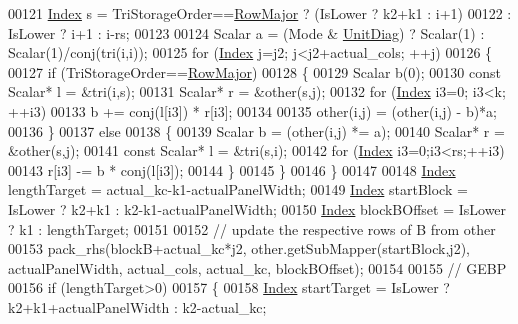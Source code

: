 \begin{DoxyCode}
00121             \hyperlink{namespace_eigen_a62e77e0933482dafde8fe197d9a2cfde}{Index} s  = TriStorageOrder==\hyperlink{group__enums_ggaacded1a18ae58b0f554751f6cdf9eb13acfcde9cd8677c5f7caf6bd603666aae3}{RowMajor} ? (IsLower ? k2+k1 : i+1)
00122                                                  :  IsLower ? i+1 : i-rs;
00123 
00124             Scalar a = (Mode & \hyperlink{group__enums_gga39e3366ff5554d731e7dc8bb642f83cdaddb72f888ac85d5a1c52333e54f9374b}{UnitDiag}) ? Scalar(1) : Scalar(1)/conj(tri(i,i));
00125             \textcolor{keywordflow}{for} (\hyperlink{namespace_eigen_a62e77e0933482dafde8fe197d9a2cfde}{Index} j=j2; j<j2+actual\_cols; ++j)
00126             \{
00127               \textcolor{keywordflow}{if} (TriStorageOrder==\hyperlink{group__enums_ggaacded1a18ae58b0f554751f6cdf9eb13acfcde9cd8677c5f7caf6bd603666aae3}{RowMajor})
00128               \{
00129                 Scalar b(0);
00130                 \textcolor{keyword}{const} Scalar* l = &tri(i,s);
00131                 Scalar* r = &other(s,j);
00132                 \textcolor{keywordflow}{for} (\hyperlink{namespace_eigen_a62e77e0933482dafde8fe197d9a2cfde}{Index} i3=0; i3<k; ++i3)
00133                   b += conj(l[i3]) * r[i3];
00134 
00135                 other(i,j) = (other(i,j) - b)*a;
00136               \}
00137               \textcolor{keywordflow}{else}
00138               \{
00139                 Scalar b = (other(i,j) *= a);
00140                 Scalar* r = &other(s,j);
00141                 \textcolor{keyword}{const} Scalar* l = &tri(s,i);
00142                 \textcolor{keywordflow}{for} (\hyperlink{namespace_eigen_a62e77e0933482dafde8fe197d9a2cfde}{Index} i3=0;i3<rs;++i3)
00143                   r[i3] -= b * conj(l[i3]);
00144               \}
00145             \}
00146           \}
00147 
00148           \hyperlink{namespace_eigen_a62e77e0933482dafde8fe197d9a2cfde}{Index} lengthTarget = actual\_kc-k1-actualPanelWidth;
00149           \hyperlink{namespace_eigen_a62e77e0933482dafde8fe197d9a2cfde}{Index} startBlock   = IsLower ? k2+k1 : k2-k1-actualPanelWidth;
00150           \hyperlink{namespace_eigen_a62e77e0933482dafde8fe197d9a2cfde}{Index} blockBOffset = IsLower ? k1 : lengthTarget;
00151 
00152           \textcolor{comment}{// update the respective rows of B from other}
00153           pack\_rhs(blockB+actual\_kc*j2, other.getSubMapper(startBlock,j2), actualPanelWidth, actual\_cols, 
      actual\_kc, blockBOffset);
00154 
00155           \textcolor{comment}{// GEBP}
00156           \textcolor{keywordflow}{if} (lengthTarget>0)
00157           \{
00158             \hyperlink{namespace_eigen_a62e77e0933482dafde8fe197d9a2cfde}{Index} startTarget  = IsLower ? k2+k1+actualPanelWidth : k2-actual\_kc;

\end{DoxyCode}
